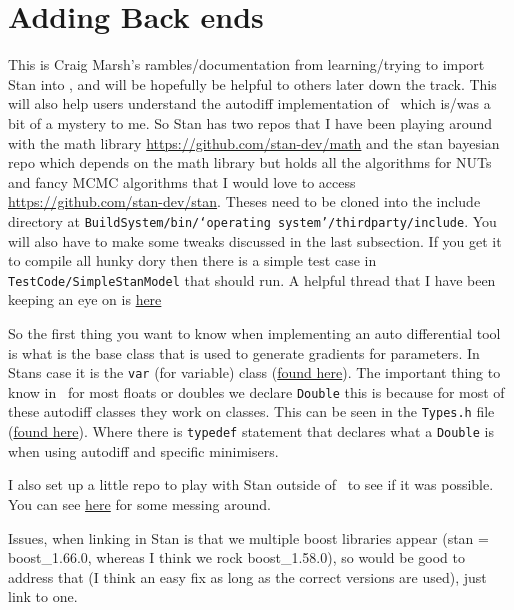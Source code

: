 \section{Adding Back ends\label{sec:addingBackends}}
This is Craig Marsh's rambles/documentation from learning/trying to import Stan into \CNAME, and will be hopefully be helpful to others later down the track. This will also help users understand the autodiff implementation of \CNAME\ which is/was a bit of a mystery to me. So Stan has two repos that I have been playing around with the math library \url{https://github.com/stan-dev/math} and the stan bayesian repo which depends on the math library but holds all the algorithms for NUTs and fancy MCMC algorithms that I would love to access \url{https://github.com/stan-dev/stan}. Theses need to be cloned into the include directory at \texttt{BuildSystem/bin/\enquote*{operating system}/thirdparty/include}. You will also have to make some tweaks discussed in the last subsection. If you get it to compile all hunky dory then there is a simple test case in \texttt{TestCode/SimpleStanModel} that should run. A helpful thread that I have been keeping an eye on is \href{https://discourse.mc-stan.org/t/use-stan-easily-from-c/2900/11}{here}


So the first thing you want to know when implementing an auto differential tool is what is the base class that is used to generate gradients for parameters. In Stans case it is the \texttt{var} (for variable) class (\href{https://github.com/stan-dev/math/blob/develop/stan/math/rev/core/var.hpp}{found here}). The important thing to know in \CNAME\ for most floats or doubles we declare \texttt{Double} this is because for most of these autodiff classes they work on classes. This can be seen in the \texttt{Types.h} file (\href{https://github.com/NIWAFisheriesModelling/CASAL2/blob/master/CASAL2/source/Utilities/Types.h}{found here}). Where there is \texttt{typedef} statement that declares what a \texttt{Double} is when using autodiff and specific minimisers. 


I also set up a little repo to play with Stan outside of \CNAME\ to see if it was possible. You can see \href{https://github.com/Craig44/UsingStancpp}{here} for some messing around. 


Issues, when linking in Stan is that we multiple boost libraries appear (stan = boost\_1.66.0, whereas I think we rock boost\_1.58.0), so would be good to address that (I think an easy fix as long as the correct versions are used), just link to one.

